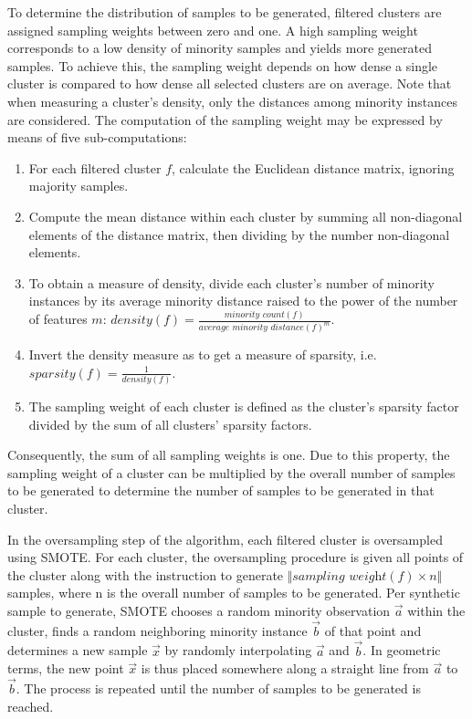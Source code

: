 \documentclass[sort&compress]{elsarticle}
\begin{document}
	To determine the distribution of samples to be generated, filtered clusters
	are assigned sampling weights between zero and one. A high sampling weight
	corresponds to a low density of minority samples and yields more generated
	samples. To achieve this, the sampling weight depends on how dense a single
	cluster is compared to how dense all selected clusters are on average. Note
	that when measuring a cluster's density, only the distances among minority
	instances are considered. The computation of the sampling weight may be
	expressed by means of five sub-computations:
	\begin{enumerate}
		\item For each filtered cluster $f$, calculate the Euclidean distance
		matrix, ignoring majority samples.
		\item Compute the mean distance within each cluster by summing all
		non-diagonal elements of the distance matrix, then dividing by the
		number non-diagonal elements.
		\item To obtain a measure of density, divide each cluster's number of
		minority instances by its average minority distance raised to the power
		of the number of features $m$: $density(f) = \frac{\textit{minority
		count}(f)}{\textit{average minority distance}(f)^{m}}$.
		\item Invert the density measure as to get a measure of sparsity, i.e.
		$sparsity(f) = \frac{1}{density(f)}$.
		\item The sampling weight of each cluster is defined as the cluster's
		sparsity factor divided by the sum of all clusters' sparsity factors.
	\end{enumerate}
	 Consequently, the sum of all sampling weights is one. Due to this property,
	 the sampling weight of a cluster can be multiplied by the overall number of
	 samples to be generated to determine the number of samples to be generated
	 in that cluster.

	In the oversampling step of the algorithm, each filtered cluster is
	oversampled using \ac{SMOTE}. For each cluster, the oversampling procedure
	is given all points of the cluster along with the instruction to generate
	$\Vert \textit{sampling weight}(f) \times n \Vert$ samples, where n is the
	overall number of samples to be generated. Per synthetic sample to generate,
	\ac{SMOTE} chooses a random minority observation $\vec{a}$ within the
	cluster, finds a random neighboring minority instance $\vec{b}$ of that
	point and determines a new sample $\vec{x}$ by randomly interpolating
	$\vec{a}$ and $\vec{b}$. In geometric terms, the new point $\vec{x}$ is thus
	placed somewhere along a straight line from $\vec{a}$ to $\vec{b}$. The
	process is repeated until the number of samples to be generated is reached. 
	
\end{document}

